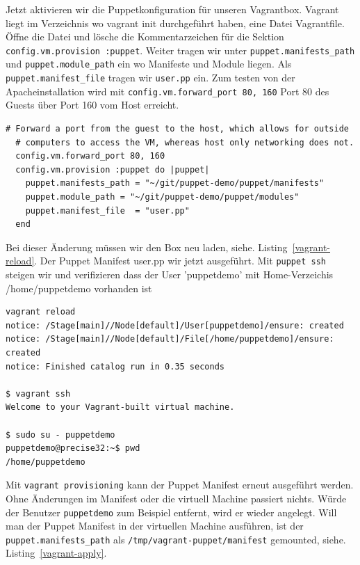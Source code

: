 \documentclass[12pt,a4paper,ngerman]{article}
\newcommand{\reflst}[1]{, siehe. Listing~\ref{#1}}
\begin{document}
Jetzt aktivieren wir die Puppetkonfiguration für unseren Vagrantbox. Vagrant liegt im Verzeichnis wo vagrant init durchgeführt haben, eine Datei Vagrantfile.
Öffne die Datei und lösche die Kommentarzeichen für die Sektion \lstinline$config.vm.provision :puppet$. Weiter tragen wir unter \lstinline$puppet.manifests_path$ und \lstinline$puppet.module_path$ ein wo Manifeste und Module liegen. Als \lstinline$puppet.manifest_file$ tragen wir \lstinline$user.pp$ ein. Zum testen von der Apacheinstallation wird mit \lstinline$config.vm.forward_port 80, 160$ Port 80 des Guests über Port 160 vom Host erreicht.
  
\begin{lstlisting}[caption=Puppet Provisioning in Vagrantfile konfigurieren, label=vagrantprovisioning]
  # Forward a port from the guest to the host, which allows for outside
  # computers to access the VM, whereas host only networking does not.
  config.vm.forward_port 80, 160  
  config.vm.provision :puppet do |puppet|
    puppet.manifests_path = "~/git/puppet-demo/puppet/manifests"
    puppet.module_path = "~/git/puppet-demo/puppet/modules"
    puppet.manifest_file  = "user.pp"
  end
\end{lstlisting} 

Bei dieser Änderung müssen wir den Box neu laden\reflst{vagrant-reload}. Der Puppet Manifest user.pp wir jetzt ausgeführt. Mit \lstinline$puppet ssh$ steigen wir und verifizieren dass der User 'puppetdemo' mit Home-Verzeichis /home/puppetdemo vorhanden ist

\begin{lstlisting}[caption=Vagrant Box neu laden, label=vagrant-reload]
vagrant reload
notice: /Stage[main]//Node[default]/User[puppetdemo]/ensure: created
notice: /Stage[main]//Node[default]/File[/home/puppetdemo]/ensure: created
notice: Finished catalog run in 0.35 seconds

$ vagrant ssh
Welcome to your Vagrant-built virtual machine.

$ sudo su - puppetdemo
puppetdemo@precise32:~$ pwd
/home/puppetdemo
\end{lstlisting}

Mit \lstinline$vagrant provisioning$ kann der Puppet Manifest erneut ausgeführt werden. Ohne Änderungen im Manifest oder die virtuell Machine passiert nichts. Würde der Benutzer \lstinline$puppetdemo$ zum Beispiel entfernt, wird er wieder angelegt.
Will man der Puppet Manifest in der virtuellen Machine ausführen, ist der \lstinline$puppet.manifests_path$ als \lstinline$/tmp/vagrant-puppet/manifest$ gemounted\reflst{vagrant-apply}.
\end{document}
